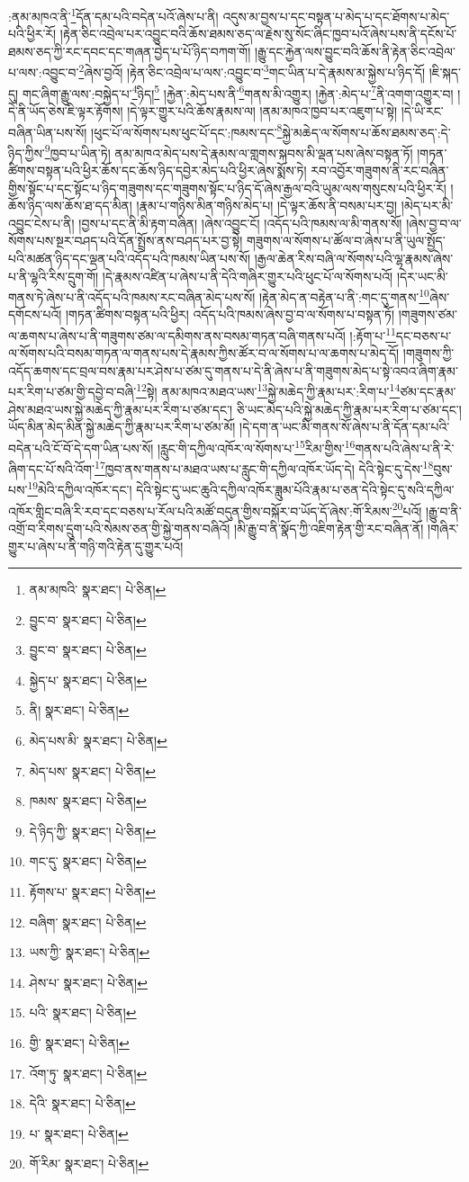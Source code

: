 :ནམ་མཁའ་ནི་\footnote{ནམ་མཁའི་  སྣར་ཐང་།  པེ་ཅིན། }དོན་དམ་པའི་བདེན་པའོ་ཞེས་པ་ནི། འདུས་མ་བྱས་པ་དང་བསྟན་པ་མེད་པ་དང་ཐོགས་པ་མེད་པའི་ཕྱིར་རོ། །རྟེན་ཅིང་འབྲེལ་པར་འབྱུང་བའི་ཆོས་ཐམས་ཅད་ལ་རྗེས་སུ་སོང་ཞིང་ཁྱབ་པའོ་ཞེས་པས་ནི་དངོས་པོ་ཐམས་ཅད་ཀྱི་རང་དབང་དང་གཞན་བྱེད་པ་པོ་ཉིད་བཀག་གོ། །རྒྱུ་དང་རྐྱེན་ལས་བྱུང་བའི་ཆོས་ནི་རྟེན་ཅིང་འབྲེལ་པ་ལས་:འབྱུང་བ་\footnote{བྱུང་བ་  སྣར་ཐང་།  པེ་ཅིན། }ཞེས་བྱའོ། །རྟེན་ཅིང་འབྲེལ་པ་ལས་:འབྱུང་བ་\footnote{བྱུང་བ་  སྣར་ཐང་།  པེ་ཅིན། }གང་ཡིན་པ་དེ་རྣམས་མ་སྐྱེས་པ་ཉིད་དོ། །ཇི་སྐད་དུ། གང་ཞིག་རྒྱུ་ལས་:བསྐྱེད་པ་\footnote{སྐྱེད་པ་  སྣར་ཐང་།  པེ་ཅིན། }ཉིད།\footnote{ནི།  སྣར་ཐང་།  པེ་ཅིན། } །རྐྱེན་:མེད་པས་ནི་\footnote{མེད་པས་མི་  སྣར་ཐང་།  པེ་ཅིན། }གནས་མི་འགྱུར། །རྐྱེན་:མེད་པ་\footnote{མེད་པས་  སྣར་ཐང་།  པེ་ཅིན། }ནི་འགག་འགྱུར་བ། །དེ་ནི་ཡོད་ཅེས་ཇི་ལྟར་རྟོགས། །དེ་ལྟར་གྱུར་པའི་ཆོས་རྣམས་ལ། །ནམ་མཁའ་ཁྱབ་པར་འཇུག་པ་སྟེ། །དེ་ཡི་རང་བཞིན་ཡིན་པས་སོ། །ཕུང་པོ་ལ་སོགས་པས་ཕུང་པོ་དང་:ཁམས་དང་\footnote{ཁམས་  སྣར་ཐང་།  པེ་ཅིན། }སྐྱེ་མཆེད་ལ་སོགས་པ་ཆོས་ཐམས་ཅད་:དེ་ཉིད་ཀྱིས་\footnote{དེ་ཉིད་ཀྱི་  སྣར་ཐང་།  པེ་ཅིན། }ཁྱབ་པ་ཡིན་ཏེ། ནམ་མཁའ་མེད་པས་དེ་རྣམས་ལ་གླགས་སྐབས་མི་ལྡན་པས་ཞེས་བསྟན་ཏོ། །གཏན་ཚིགས་བསྟན་པའི་ཕྱིར་ཆོས་དང་ཆོས་ཉིད་དབྱེར་མེད་པའི་ཕྱིར་ཞེས་སྨོས་ཏེ། རབ་འབྱོར་གཟུགས་ནི་རང་བཞིན་གྱིས་སྟོང་པ་དང་སྟོང་པ་ཉིད་གཟུགས་དང་གཟུགས་སྟོང་པ་ཉིད་དོ་ཞེས་རྒྱལ་བའི་ཡུམ་ལས་གསུངས་པའི་ཕྱིར་རོ། །ཆོས་ཉིད་ལས་ཆོས་ཐ་དད་མིན། །རྣམ་པ་གཉིས་མིན་གཉིས་མེད་པ། །དེ་ལྟར་ཆོས་ནི་བསམ་པར་བྱ། །མེད་པར་མི་འབྱུང་ངེས་པ་ནི། །བྱས་པ་དང་ནི་མི་རྟག་བཞིན། །ཞེས་འབྱུང་ངོ། །འདོད་པའི་ཁམས་ལ་མི་གནས་སོ། །ཞེས་བྱ་བ་ལ་སོགས་པས་སྔར་བཤད་པའི་དོན་སྤྲོས་ནས་བཤད་པར་བྱ་སྟེ། གཟུགས་ལ་སོགས་པ་ཚོལ་བ་ཞེས་པ་ནི་ཡུལ་སྤྱོད་པའི་མཚན་ཉིད་དང་ལྡན་པའི་འདོད་པའི་ཁམས་ཡིན་པས་སོ། །རྒྱལ་ཆེན་རིས་བཞི་ལ་སོགས་པའི་ལྷ་རྣམས་ཞེས་པ་ནི་ལྷའི་རིས་དྲུག་གོ། །དེ་རྣམས་འཛིན་པ་ཞེས་པ་ནི་དེའི་གཞིར་གྱུར་པའི་ཕུང་པོ་ལ་སོགས་པའོ། །དེར་ཡང་མི་གནས་ཏེ་ཞེས་པ་ནི་འདོད་པའི་ཁམས་རང་བཞིན་མེད་པས་སོ། །རྟེན་མེད་ན་བརྟེན་པ་ནི་:གང་དུ་གནས་\footnote{གང་དུ་  སྣར་ཐང་།  པེ་ཅིན། }ཞེས་དགོངས་པའོ། །གཏན་ཚིགས་བསྟན་པའི་ཕྱིར། འདོད་པའི་ཁམས་ཞེས་བྱ་བ་ལ་སོགས་པ་བསྟན་ཏོ། །གཟུགས་ཙམ་ལ་ཆགས་པ་ཞེས་པ་ནི་གཟུགས་ཙམ་ལ་དམིགས་ནས་བསམ་གཏན་བཞི་གནས་པའོ། །:རྟོག་པ་\footnote{རྟོགས་པ་  སྣར་ཐང་།  པེ་ཅིན། }དང་བཅས་པ་ལ་སོགས་པའི་བསམ་གཏན་ལ་གནས་པས་དེ་རྣམས་ཀྱིས་ཚོར་བ་ལ་སོགས་པ་ལ་ཆགས་པ་མེད་དོ། །གཟུགས་ཀྱི་འདོད་ཆགས་དང་བྲལ་བས་རྣམ་པར་ཤེས་པ་ཙམ་དུ་གནས་པ་དེ་ནི་ཞེས་པ་ནི་གཟུགས་མེད་པ་སྟེ་འབའ་ཞིག་རྣམ་པར་རིག་པ་ཙམ་གྱི་དབྱེ་བ་བཞི་\footnote{བཞིག་  སྣར་ཐང་།  པེ་ཅིན། }སྟེ། ནམ་མཁའ་མཐའ་ཡས་\footnote{ཡས་ཀྱི་  སྣར་ཐང་།  པེ་ཅིན། }སྐྱེ་མཆེད་ཀྱི་རྣམ་པར་:རིག་པ་\footnote{ཤེས་པ་  སྣར་ཐང་།  པེ་ཅིན། }ཙམ་དང་རྣམ་ཤེས་མཐའ་ཡས་སྐྱེ་མཆེད་ཀྱི་རྣམ་པར་རིག་པ་ཙམ་དང་། ཅི་ཡང་མེད་པའི་སྐྱེ་མཆེད་ཀྱི་རྣམ་པར་རིག་པ་ཙམ་དང་། ཡོད་མིན་མེད་མིན་སྐྱེ་མཆེད་ཀྱི་རྣམ་པར་རིག་པ་ཙམ་མོ། །དེ་དག་ན་ཡང་མི་གནས་སོ་ཞེས་པ་ནི་དོན་དམ་པའི་བདེན་པའི་ངོ་བོ་དེ་དག་ཡིན་པས་སོ། །རླུང་གི་དཀྱིལ་འཁོར་ལ་སོགས་པ་\footnote{པའི་  སྣར་ཐང་།  པེ་ཅིན། }རིམ་གྱིས་\footnote{གྱི་  སྣར་ཐང་།  པེ་ཅིན། }གནས་པའི་ཞེས་པ་ནི་རེ་ཞིག་དང་པོ་སའི་འོག་\footnote{འོག་ཏུ་  སྣར་ཐང་།  པེ་ཅིན། }ཁྱབ་ནས་གནས་པ་མཐའ་ཡས་པ་རླུང་གི་དཀྱིལ་འཁོར་ཡོད་དེ། དེའི་སྟེང་དུ་དེས་\footnote{དེའི་  སྣར་ཐང་།  པེ་ཅིན། }བུས་པས་\footnote{པ་  སྣར་ཐང་།  པེ་ཅིན། }མེའི་དཀྱིལ་འཁོར་དང་། དེའི་སྟེང་དུ་ཡང་ཆུའི་དཀྱིལ་འཁོར་ཟླུམ་པོའི་རྣམ་པ་ཅན་དེའི་སྟེང་དུ་སའི་དཀྱིལ་འཁོར་གླིང་བཞི་རི་རབ་དང་བཅས་པ་རོལ་པའི་མཚོ་བདུན་གྱིས་བསྐོར་བ་ཡོད་དོ་ཞེས་:གོ་རིམས་\footnote{གོ་རིམ་  སྣར་ཐང་།  པེ་ཅིན། }པའོ། །རྒྱུ་བ་ནི་འགྲོ་བ་རིགས་དྲུག་པའི་སེམས་ཅན་གྱི་སྐྱེ་གནས་བཞིའོ། །མི་རྒྱུ་བ་ནི་སྣོད་ཀྱི་འཇིག་རྟེན་གྱི་རང་བཞིན་ནོ། །གཞིར་གྱུར་པ་ཞེས་པ་ནི་གཉི་གའི་རྟེན་དུ་གྱུར་པའོ། 